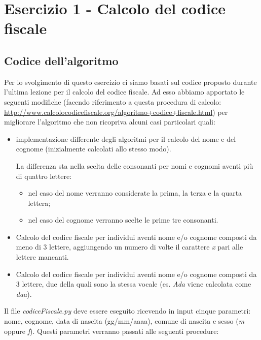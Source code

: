 \documentclass[a4paper, 12pt]{article}
\begin{document}
	\newpage
	\section*{Esercizio 1 - Calcolo del codice fiscale}
	\subsection*{Codice dell'algoritmo}
	Per lo svolgimento di questo esercizio ci siamo basati sul codice proposto durante l'ultima lezione per il calcolo del codice fiscale. Ad esso abbiamo apportato le seguenti modifiche (facendo riferimento a questa procedura di calcolo: \url{http://www.calcolocodicefiscale.org/algoritmo+codice+fiscale.html}) per migliorare l'algoritmo che non ricopriva alcuni casi particolari quali:
	\begin{itemize}
		
		\item implementazione differente degli algoritmi per il calcolo del nome e del cognome (inizialmente calcolati allo stesso modo).
		
		\noindent
		La differenza sta nella scelta delle consonanti per nomi e cognomi aventi più di quattro lettere: 
		\begin{itemize}
			\item nel caso del nome verranno considerate la prima, la terza e la quarta lettera;
			
			\item nel caso del cognome verranno scelte le prime tre consonanti.
			
		\end{itemize}
		
		\item Calcolo del codice fiscale per individui aventi nome e/o cognome composti da meno di 3 lettere, aggiungendo un numero di volte il carattere \textit{x} pari alle lettere mancanti.
		
		\item Calcolo del codice fiscale per individui aventi nome e/o cognome composti da 3 lettere, due della quali sono la stessa vocale (es. \textit{Ada} viene calcolata come \textit{daa}).
		
	\end{itemize}
	\noindent
	Il file \textit{codiceFiscale.py} deve essere eseguito ricevendo in input cinque parametri: nome, cognome, data di nascita (gg/mm/aaaa), comune di nascita e sesso (\textit{m} oppure \textit{f}). Questi parametri verranno passati alle seguenti procedure:
\end{document}
